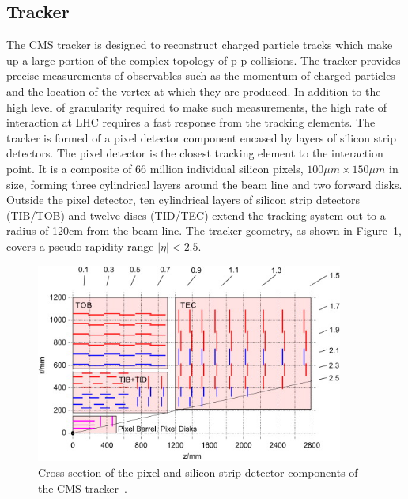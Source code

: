 \subsection{Tracker}
The CMS tracker is designed to reconstruct charged particle tracks 
which make up a large portion of the complex topology of 
p-p collisions. The tracker provides precise measurements of 
observables such as the momentum of charged particles and the location of the
vertex at which they are produced.
In addition to the high level of granularity required to make such measurements, the 
high rate of interaction at LHC requires a fast response from the tracking 
elements. 
The tracker is formed of a pixel detector component encased by layers of silicon strip detectors.
The pixel detector is the closest tracking element to the interaction point. 
It is a composite of 66 million individual silicon pixels, $100\mu m \times 150 \mu m$ in size,
forming three cylindrical layers around the beam line and two forward disks. 
Outside the pixel detector, ten cylindrical layers of silicon strip detectors (TIB/TOB) 
and twelve discs (TID/TEC) extend the tracking system out to a radius of 120cm from the 
beam line. The tracker geometry, as shown in Figure~\ref{fig:trackergeom}, covers a pseudo-rapidity 
range $|\eta| < 2.5$.

\begin{figure}
	\centering
	\includegraphics[width=0.9\textwidth]{detector/trcker/tracker_col.jpg}
	\caption{Cross-section of the pixel and silicon strip detector 
	components of the CMS tracker~\cite{Weber201159}.}
   \label{fig:trackergeom}
\end{figure}

